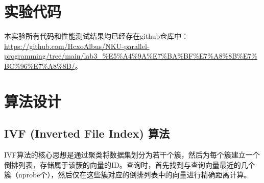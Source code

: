 \documentclass[a4paper]{article}
\begin{document}
	\section{实验代码} %
	本实验所有代码和性能测试结果均已经存在github仓库中：\url{https://github.com/HcxoAlbus/NKU-parallel-programming/tree/main/lab3_%E5%A4%9A%E7%BA%BF%E7%A8%8B%E7%BC%96%E7%A8%8B/}。 %
	
	\section{算法设计} %
	
	\subsection{IVF (Inverted File Index) 算法}
	IVF算法的核心思想是通过聚类将数据集划分为若干个簇，然后为每个簇建立一个倒排列表，存储属于该簇的向量的ID。查询时，首先找到与查询向量最近的几个簇（nprobe个），然后仅在这些簇对应的倒排列表中的向量进行精确距离计算。
	
\end{document}
